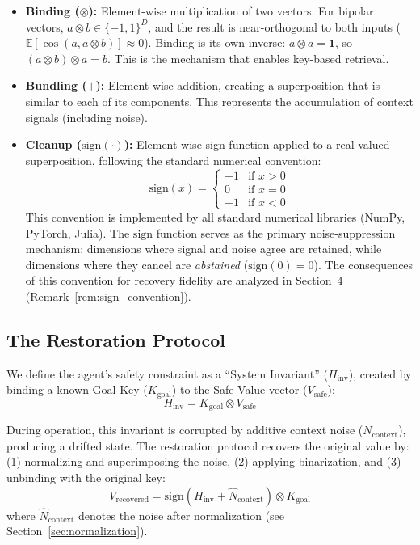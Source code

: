 \documentclass[a4paper,11pt]{article}
\begin{document}
\begin{itemize}
    \item \textbf{Binding ($\otimes$):} Element-wise multiplication of two vectors. For bipolar vectors, $a \otimes b \in \{-1,1\}^D$, and the result is near-orthogonal to both inputs ($\mathbb{E}[\cos(a, a \otimes b)] \approx 0$). Binding is its own inverse: $a \otimes a = \mathbf{1}$, so $(a \otimes b) \otimes a = b$. This is the mechanism that enables key-based retrieval.
    \item \textbf{Bundling ($+$):} Element-wise addition, creating a superposition that is similar to each of its components. This represents the accumulation of context signals (including noise).
    \item \textbf{Cleanup ($\text{sign}(\cdot)$):} Element-wise sign function applied to a real-valued superposition, following the standard numerical convention:
    \begin{equation}
        \text{sign}(x) = \begin{cases} +1 & \text{if } x > 0 \\ 0 & \text{if } x = 0 \\ -1 & \text{if } x < 0 \end{cases}
        \label{eq:sign_convention}
    \end{equation}
    This convention is implemented by all standard numerical libraries (NumPy, PyTorch, Julia). The $\text{sign}$ function serves as the primary noise-suppression mechanism: dimensions where signal and noise agree are retained, while dimensions where they cancel are \textit{abstained} ($\text{sign}(0) = 0$). The consequences of this convention for recovery fidelity are analyzed in Section~4 (Remark~\ref{rem:sign_convention}).
\end{itemize}

\subsection{The Restoration Protocol}
We define the agent's safety constraint as a ``System Invariant'' ($H_{\text{inv}}$), created by binding a known Goal Key ($K_{\text{goal}}$) to the Safe Value vector ($V_{\text{safe}}$):
\begin{equation}
    H_{\text{inv}} = K_{\text{goal}} \otimes V_{\text{safe}}
    \label{eq:invariant}
\end{equation}

During operation, this invariant is corrupted by additive context noise ($N_{\text{context}}$), producing a drifted state. The restoration protocol recovers the original value by: (1) normalizing and superimposing the noise, (2) applying binarization, and (3) unbinding with the original key:
\begin{equation}
    V_{\text{recovered}} = \text{sign}\!\left(H_{\text{inv}} + \hat{N}_{\text{context}}\right) \otimes K_{\text{goal}}
    \label{eq:restoration}
\end{equation}
where $\hat{N}_{\text{context}}$ denotes the noise after normalization (see Section~\ref{sec:normalization}).
\end{document}
